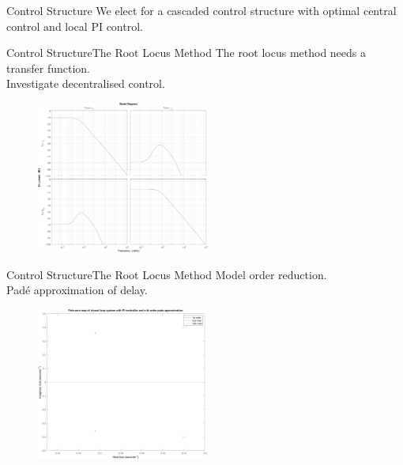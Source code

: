
\begin{frame}{Control Structure}
	We elect for a cascaded control structure with optimal central control and local PI control.
	\begin{figure}[h!]
		\centering
		\resizebox{\columnwidth}{!}{
			}
		\label{fig:tikzControlStrat}
	\end{figure}
\end{frame}

\begin{frame}{Control Structure}{The Root Locus Method}
	The root locus method needs a transfer function.\\
	Investigate decentralised control.\\
	\begin{figure}[h]
		\centering
		\includegraphics[height=5cm,width=0.5\linewidth]{Topics/ControlStructure/Graphics/PumpMagPlot.png}
		\label{fig:PumpMagPlot}
	\end{figure}
\end{frame}

\begin{frame}{Control Structure}{The Root Locus Method}
	Model order reduction.\\
	Padé approximation of delay.\\
	\begin{figure}[h]
		\centering
		\includegraphics[height=5cm,width=0.5\linewidth]{Topics/ControlStructure/Graphics/PZmap_CL_zoom.png}
		\label{fig:PZmap_CL_zoom}
	\end{figure}
\end{frame}

